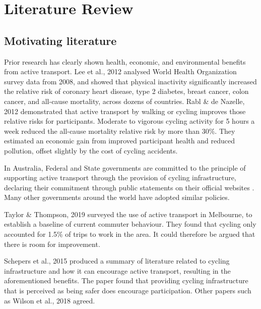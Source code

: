 \documentclass[11pt,twoside]{report}
\begin{document}
\chapter{Literature Review}
\label{s:literature}


\section{Motivating literature}

Prior research has clearly shown health, economic, and environmental benefits from active transport.  Lee et al., 2012 \cite{LEE2012219} analysed World Health Organization survey data from 2008, and showed that physical inactivity significantly increased the relative risk of coronary heart disease, type 2 diabetes, breast cancer, colon cancer, and all-cause mortality, across dozens of countries.  Rabl \& de Nazelle, 2012 \cite{RABL2012121} demonstrated that active transport by walking or cycling improves those relative risks for participants.  Moderate to vigorous cycling activity for 5 hours a week reduced the all-cause mortality relative risk by more than 30\%.  They estimated an economic gain from improved participant health and reduced pollution, offset slightly by the cost of cycling accidents.

In Australia, Federal and State governments are committed to the principle of supporting active transport through the provision of cycling infrastructure, declaring their commitment through public statements on their official websites \cite{federal_policy_2019} \cite{state_policy_2020}.  Many other governments around the world have adopted similar policies.

Taylor \& Thompson, 2019 \cite{melbactive} surveyed the use of active transport in Melbourne, to establish a baseline of current commuter behaviour.  They found that cycling only accounted for 1.5\% of trips to work in the area.  It could therefore be argued that there is room for improvement.

Schepers et al., 2015 \cite{SCHEPERS2015460} produced a summary of literature related to cycling infrastructure and how it can encourage active transport, resulting in the aforementioned benefits.  The paper found that providing cycling infrastructure that is perceived as being safer does encourage participation.  Other papers such as Wilson et al., 2018 \cite{WILSON2018234} agreed.
\end{document}
